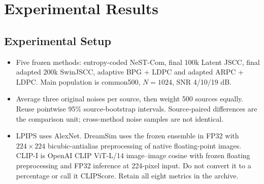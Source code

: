 \documentclass[10pt]{article}
\begin{document}
\section{Experimental Results}
\subsection{Experimental Setup}
\begin{itemize}
\item Five frozen methods: entropy-coded NeST-Com, final 100k Latent JSCC, final adapted 200k SwinJSCC, adaptive BPG + LDPC and adapted ARPC + LDPC. Main population is common500, $N=1024$, SNR 4/10/19 dB.
\item Average three original noises per source, then weight 500 sources equally. Reuse pointwise 95\% source-bootstrap intervals. Source-paired differences are the comparison unit; cross-method noise samples are not identical.
\item LPIPS uses AlexNet. DreamSim uses the frozen ensemble in FP32 with $224\times224$ bicubic-antialias preprocessing of native floating-point images. CLIP-I is OpenAI CLIP ViT-L/14 image--image cosine with frozen floating preprocessing and FP32 inference at 224-pixel input. Do not convert it to a percentage or call it CLIPScore. Retain all eight metrics in the archive.
\end{itemize}
\end{document}
